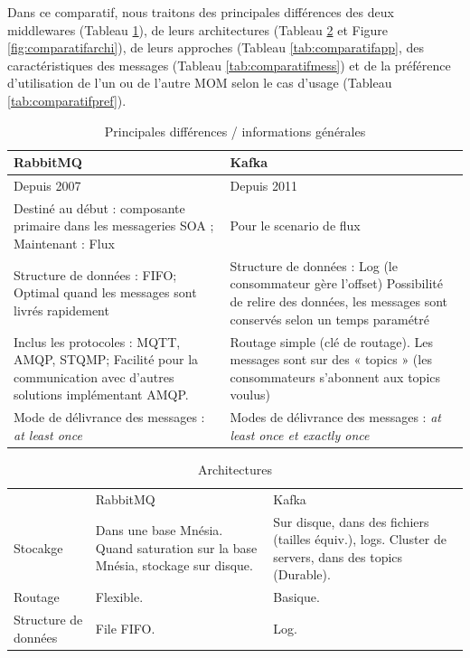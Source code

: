 \documentclass{article}
\begin{document}
			Dans ce comparatif, nous traitons des principales différences des deux middlewares (Tableau \ref{tab:comparatifinfos}), de leurs architectures (Tableau \ref{tab:comparatifarchi} et Figure \ref{fig:comparatifarchi}), de leurs approches (Tableau \ref{tab:comparatifapp}, des caractéristiques des messages (Tableau \ref{tab:comparatifmess}) et de la préférence d'utilisation de l'un ou de l'autre MOM selon le cas d'usage (Tableau \ref{tab:comparatifpref}).\newline
			\begin{table}
				\begin{tabular}{|p{8cm}|p{8cm}|}
					\hline
					\rowcolor{lightgray} RabbitMQ & Kafka\\\hline
					Depuis 2007 & Depuis 2011\\\hline
					Destiné au début : composante primaire dans les messageries SOA ; Maintenant : Flux & Pour le scenario de flux\\\hline
					Structure de données : FIFO; Optimal quand les messages sont livrés rapidement & Structure de données : Log (le consommateur gère l’offset) Possibilité de relire des données, les messages sont conservés selon un temps paramétré\\\hline
					Inclus les protocoles : MQTT, AMQP, STQMP; Facilité pour la communication avec d’autres solutions implémentant AMQP. & Routage simple (clé de routage). Les messages sont sur des « topics » (les consommateurs s’abonnent aux topics voulus)\\\hline
					Mode de délivrance des messages : \textit{at least once} & Modes de délivrance des messages : \textit{at least once et exactly once}\\\hline
				\end{tabular}
				\caption{Principales différences / informations générales}
				\label{tab:comparatifinfos}
			\end{table}
			\medskip
			\begin{table}
				\begin{tabular}{|p{4cm}|p{6cm}|p{6cm}|}
					\rowcolor{lightgray} & RabbitMQ & Kafka\\
					Stocakge & Dans une base Mnésia. Quand saturation sur la base Mnésia, stockage sur disque. & Sur disque, dans des fichiers (tailles équiv.), logs. Cluster de servers, dans des topics (Durable). \\\hline
					Routage & Flexible. & Basique.\\\hline
					Structure de données & File FIFO. & Log.\\\hline
				\end{tabular}
				\caption{Architectures}
				\label{tab:comparatifarchi}
			\end{table}
\end{document}
